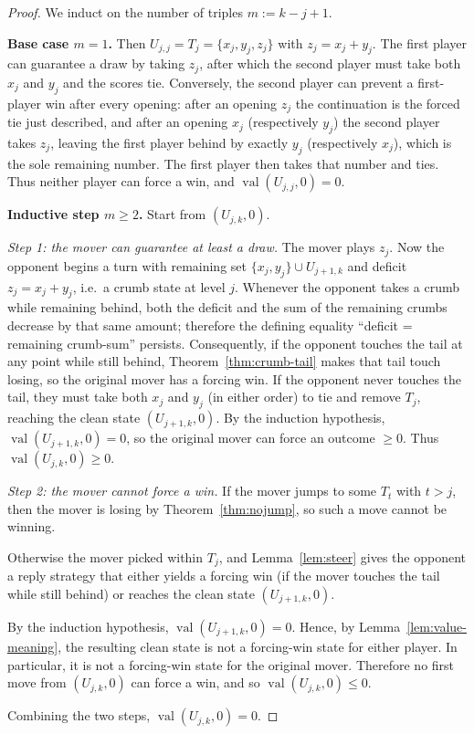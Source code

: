\documentclass[11pt]{article}
\newcommand{\val}{\operatorname{val}}
\begin{document}
\begin{proof}
We induct on the number of triples $m:=k-j+1$.

\smallskip\noindent
\textbf{Base case $m=1$.}
Then $U_{j,j}=T_j=\{x_j,y_j,z_j\}$ with $z_j=x_j+y_j$.
The first player can guarantee a draw by taking $z_j$, after which the second player must take both $x_j$ and $y_j$ and the scores tie.
Conversely, the second player can prevent a first-player win after every opening: after an opening $z_j$ the continuation is the forced tie just described,
and after an opening $x_j$ (respectively $y_j$) the second player takes $z_j$, leaving the first player behind by exactly
$y_j$ (respectively $x_j$), which is the sole remaining number. The first player then takes that number and ties.
Thus neither player can force a win, and $\val(U_{j,j},0)=0$.

\smallskip\noindent
\textbf{Inductive step $m\ge 2$.}
Start from $(U_{j,k},0)$.

\smallskip\noindent
\emph{Step 1: the mover can guarantee at least a draw.}
The mover plays $z_j$.
Now the opponent begins a turn with remaining set $\{x_j,y_j\}\cup U_{j+1,k}$ and deficit $z_j=x_j+y_j$, i.e.\ a crumb state at level $j$.
Whenever the opponent takes a crumb while remaining behind, both the deficit and the sum of the remaining crumbs decrease by that same amount;
therefore the defining equality ``deficit = remaining crumb-sum'' persists. Consequently, if the opponent touches the tail at any point while still behind,
Theorem~\ref{thm:crumb-tail} makes that tail touch losing, so the original mover has a forcing win.
If the opponent never touches the tail, they must take both $x_j$ and $y_j$ (in either order) to tie and remove $T_j$,
reaching the clean state $(U_{j+1,k},0)$.
By the induction hypothesis, $\val(U_{j+1,k},0)=0$, so the original mover can force an outcome $\ge 0$.
Thus $\val(U_{j,k},0)\ge 0$.

\smallskip\noindent
\emph{Step 2: the mover cannot force a win.}
If the mover jumps to some $T_t$ with $t>j$, then the mover is losing by Theorem~\ref{thm:nojump}, so such a move cannot be winning.

Otherwise the mover picked within $T_j$, and Lemma~\ref{lem:steer} gives the opponent a reply strategy that either yields a forcing win
(if the mover touches the tail while still behind) or reaches the clean state $(U_{j+1,k},0)$.

By the induction hypothesis, $\val(U_{j+1,k},0)=0$.
Hence, by Lemma~\ref{lem:value-meaning}, the resulting clean state is not a forcing-win state for either player.
In particular, it is not a forcing-win state for the original mover.
Therefore no first move from $(U_{j,k},0)$ can force a win, and so $\val(U_{j,k},0)\le 0$.

Combining the two steps, $\val(U_{j,k},0)=0$.
\end{proof}
\end{document}
